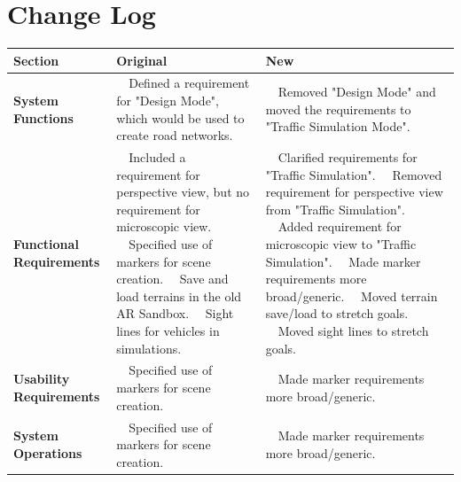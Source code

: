 \documentclass[letterpaper, 10pt, onecolumn, draftclsnofoot]{IEEEtran}
\newcommand{\tabitem}{\textbullet~~}
\begin{document}
\tableofcontents
\newpage

\section{\textbf{Change Log}}
\renewcommand{\arraystretch}{4}
\begin{center}
    \begin{tabular}{|p{4cm}|p{6cm}|p{6cm}|}
        \hline
        \centering \textbf{\large Section} & \centering \textbf{\large Original} & \centering \textbf{\large New} \tabularnewline
        \hline
        \centering \textbf{System Functions} & 
        \tabitem Defined a requirement for "Design Mode", which would be used to create road networks. \newline & 
        \tabitem Removed "Design Mode" and moved the requirements to "Traffic Simulation Mode". \\
        \hline
        \centering \textbf{Functional Requirements} & 
        \tabitem Included a requirement for perspective view, but no requirement for microscopic view. \newline 
        \tabitem Specified use of markers for scene creation. \newline 
        \tabitem Save and load terrains in the old AR Sandbox. \newline
        \tabitem Sight lines for vehicles in simulations. \newline &
        \tabitem Clarified requirements for "Traffic Simulation". \newline
        \tabitem Removed requirement for perspective view from "Traffic Simulation". \newline 
        \tabitem Added requirement for microscopic view to "Traffic Simulation". \newline 
        \tabitem Made marker requirements more broad/generic. \newline
        \tabitem Moved terrain save/load to stretch goals. \newline
        \tabitem Moved sight lines to stretch goals. \\
        \hline
        \centering \textbf{Usability Requirements} & 
        \tabitem Specified use of markers for scene creation. \newline & 
        \tabitem Made marker requirements more broad/generic. \\
        \hline
        \centering \textbf{System Operations} & 
        \tabitem Specified use of markers for scene creation. \newline & 
        \tabitem Made marker requirements more broad/generic. \\
        \hline
    \end{tabular}
\end{center}
\newpage
\end{document}
